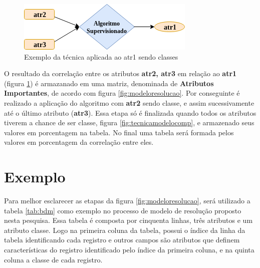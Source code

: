 \begin{figure}[h!]
        \centering
        \includegraphics[scale=0.7]{figs/tecnicamodelo.png}
        \caption{Exemplo da técnica aplicada ao atr1 sendo classes } \label{fig:tecnicamodelo}
\end{figure}

O resultado da correlação entre os atributos \textbf{atr2, atr3} em relação ao \textbf{atr1} (figura \ref{fig:tecnicamodelo}) é armazanado em uma matriz, denominada de \textbf{Atributos Importantes}, de acordo com figura \ref{fig:modeloresolucao}. Por conseguinte é realizado a aplicação do algoritmo com \textbf{atr2} sendo classe, e assim sucessivamente até o último atributo (\textbf{atr3}). Essa etapa só é finalizada quando todos os atributos tiverem a chance de ser classe, figura \ref{fig:tecnicamodelocomp}, e armazenado seus valores em porcentagem na tabela. No final uma tabela será formada pelos valores em porcentagem  da correlação entre eles.



\section{Exemplo} \label{cap:ferramentas:sec:exebasemodfic}

Para melhor esclarecer as etapas da figura \ref{fig:modeloresolucao}, será utilizado  a tabela \ref{tab:bdm} como exemplo no processo de modelo de resolução proposto nesta pesquisa. Essa tabela é composta por cinquenta linhas, três atributos e um atributo classe. Logo na primeira coluna da tabela, possui o índice da linha da tabela identificando cada registro e outros campos são atributos que definem características do registro identificado pelo índice da primeira coluna, e na quinta coluna a classe de cada registro.

